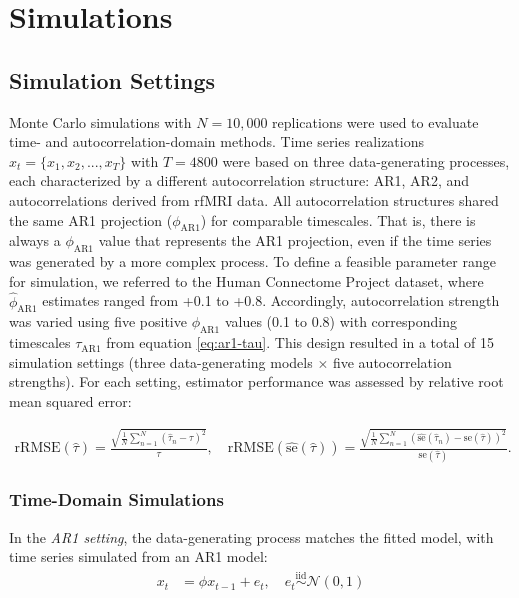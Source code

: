 \documentclass[latex/main.tex]{subfiles}
\begin{document}
\section{Simulations}\label{sec:simulations}

\subsection{Simulation Settings}
Monte Carlo simulations with $N = 10,000$ replications were used to evaluate time- and autocorrelation-domain methods. Time series realizations $x_t = \{x_1, x_2, ..., x_T\}$ with $T=4800$ were based on three data-generating processes, each characterized by a different autocorrelation structure: AR1, AR2, and autocorrelations derived from rfMRI data. All autocorrelation structures shared the same AR1 projection ($\phi_\text{AR1}$) for comparable timescales. That is, there is always a $\phi_\text{AR1}$ value that represents the AR1 projection, even if the time series was generated by a more complex process. To define a feasible parameter range for simulation, we referred to the Human Connectome Project dataset, where $\hat\phi_\text{AR1}$ estimates ranged from +0.1 to +0.8. Accordingly, autocorrelation strength was varied using five positive $\phi_\text{AR1}$ values (0.1 to 0.8) with corresponding timescales $\tau_\text{AR1}$ from equation \eqref{eq:ar1-tau}. This design resulted in a total of 15 simulation settings (three data-generating models $\times$ five autocorrelation strengths). For each setting, estimator performance was assessed by relative root mean squared error: 

\begin{align}
    \text{rRMSE}(\hat\tau) = \frac{\sqrt{\frac{1}{N} \sum_{n=1}^N (\hat\tau_n - \tau)^2}}{\tau}, \quad \text{rRMSE}(\widehat{\text{se}}(\hat\tau)) = \frac{\sqrt{\frac{1}{N} \sum_{n=1}^N \left(\widehat{\text{se}}(\hat\tau_n) - \text{se}(\hat\tau)\right)^2}}{\text{se}(\hat\tau)}.
\end{align}

\subsubsection{Time-Domain Simulations}
In the \textit{AR1 setting}, the data-generating process matches the fitted model, with time series simulated from an AR1 model:
\begin{align}
    x_t &= \phi x_{t-1} + e_t, \quad e_t \overset{\text{iid}}{\sim} \mathcal{N}(0, 1)
\end{align}
\end{document}
